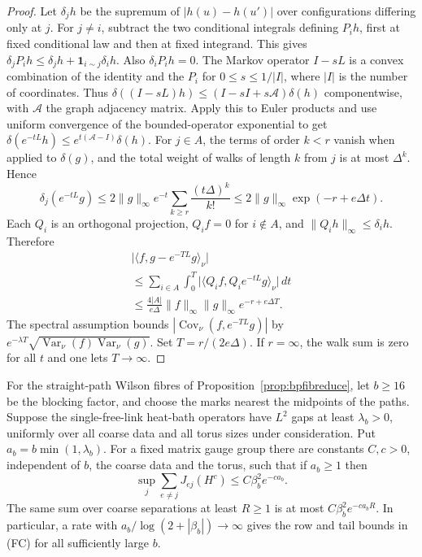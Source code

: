 \begin{proof}
Let $\delta_j h$ be the supremum of $|h(u)-h(u')|$ over configurations
differing only at $j$. For $j\ne i$, subtract the two conditional
integrals defining $P_i h$, first at fixed conditional law and then at
fixed integrand. This gives
$\delta_j P_i h\le\delta_j h+\mathbf{1}_{i\sim j}\delta_i h$.
Also $\delta_i P_i h=0$. The Markov operator $I-sL$ is a convex
combination of the identity and the $P_i$ for $0\le s\le1/|I|$, where
$|I|$ is the number of coordinates. Thus
$\delta((I-sL)h)\le (I-sI+s\mathcal A)\delta(h)$ componentwise, with
$\mathcal A$ the graph adjacency matrix. Apply this to Euler products
and use uniform convergence of the bounded-operator exponential to get
$\delta(e^{-tL}h)\le e^{t(\mathcal A-I)}\delta(h)$.
For $j\in A$, the terms of order $k<r$ vanish when applied to $\delta(g)$,
and the total weight of walks of length $k$ from $j$ is at most
$\Delta^k$. Hence
\[
 \delta_j(e^{-tL}g)\le 2\|g\|_\infty e^{-t}
   \sum_{k\ge r}\frac{(t\Delta)^k}{k!}
 \le 2\|g\|_\infty\exp(-r+e\Delta t).
\]
Each $Q_i$ is an orthogonal projection, $Q_i f=0$ for $i\notin A$, and
$\|Q_i h\|_\infty\le\delta_i h$. Therefore
\begin{multline*}
 \big|\langle f,g-e^{-TL}g\rangle_\nu\big|\\
 \le \sum_{i\in A}\int_0^T
       \big|\langle Q_i f,Q_i e^{-tL}g\rangle_\nu\big|\,dt\\
 \le \frac{4|A|}{e\Delta}\|f\|_\infty\|g\|_\infty e^{-r+e\Delta T}.
\end{multline*}
The spectral assumption bounds
$|\operatorname{Cov}_\nu(f,e^{-TL}g)|$ by
$e^{-\lambda T}\sqrt{\operatorname{Var}_\nu(f)\operatorname{Var}_\nu(g)}$.
Set $T=r/(2e\Delta)$. If $r=\infty$, the walk sum is zero for all
$t$ and one lets $T\to\infty$.
\end{proof}

\begin{corollary}
\label{cor:fibre-heatbath}
For the straight-path Wilson fibres of Proposition~\ref{prop:bpfibreduce},
let $b\ge16$ be the blocking factor, and choose the marks nearest the
midpoints of the paths. Suppose the single-free-link heat-bath operators
have $L^2$ gaps at least $\lambda_b>0$, uniformly over all coarse data and
all torus sizes under consideration. Put $a_b=b\min(1,\lambda_b)$.
For a fixed matrix gauge group there are constants $C,c>0$, independent
of $b$, the coarse data and the torus, such that if $a_b\ge1$ then
\[
 \sup_j\sum_{e\ne j}J_{ej}(H^c)\le C\beta_b^2 e^{-c a_b}.
\]
The same sum over coarse separations at least $R\ge1$ is at most
$C\beta_b^2 e^{-c a_b R}$. In particular, a rate with
$a_b/\log(2+|\beta_b|)\to\infty$ gives the row and tail bounds in
\textup{(FC)} for all sufficiently large $b$.
\end{corollary}

